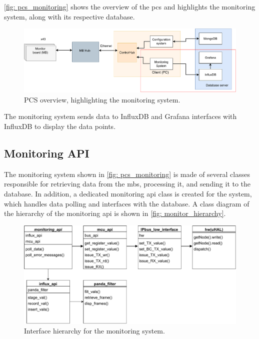 \documentclass[main.tex]{subfiles}
\begin{document}
 \autoref{fig: pcs_monitoring} shows the overview of the \gls{pcs} and highlights the monitoring system, along with its respective database.
 
 \begin{figure}[!htpb]
    \centering
    \includegraphics[width=17cm, scale=1.5]{images/PCS overview_monitor.pdf}
    \caption{PCS overview, highlighting the monitoring system.}
    \label{fig: pcs_monitoring}
\end{figure}
\FloatBarrier
 
 The monitoring system sends data to InfluxDB and Grafana interfaces with InfluxDB to display the data points. 



\subsection{Monitoring API}
The monitoring system shown in \autoref{fig: pcs_monitoring} is made of several classes responsible for retrieving data from the \gls{mb}s, processing it, and sending it to the database. In addition, a dedicated monitoring \gls{api} class is created for the system, which handles data polling and interfaces with the database. A class diagram of the hierarchy of the monitoring \gls{api} is shown in \autoref{fig: monitor_hierarchy}.

 \begin{figure}[!htpb]
    \centering
    \includegraphics[width=17cm, scale=1.5]{images/monitor_interface_hierarchy.pdf}
    \caption{Interface hierarchy for the monitoring system.}
    \label{fig: monitor_hierarchy}
\end{figure}
\FloatBarrier
\end{document}
